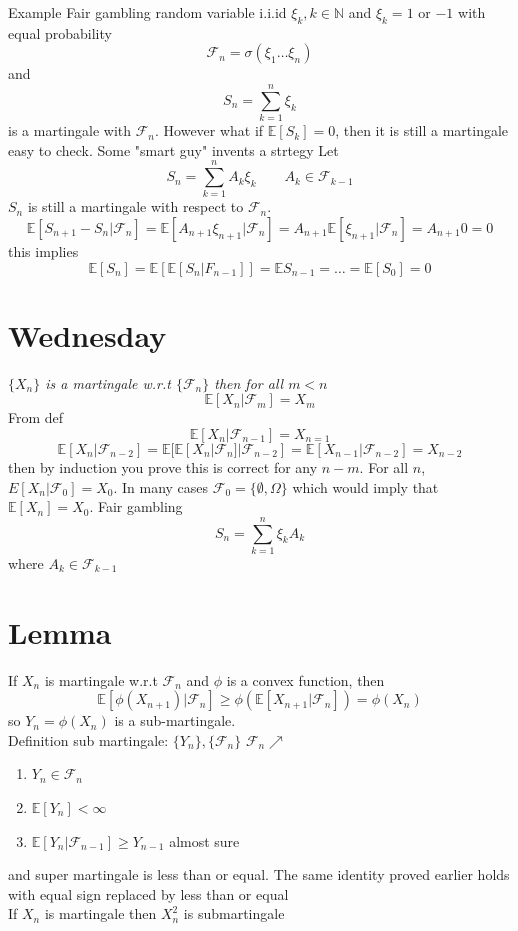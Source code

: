 \documentclass[11pt]{article}
\begin{document}
Example Fair gambling
random variable i.i.id $\xi_k, k \in \mathbb{N}$ and $\xi_k = 1$ or  $-1$ with equal probability
 \[
\mathcal{F}_n = \sigma(\xi_1 \dots \xi_n)
\] 
and
\[
S_n = \sum_{k=1}^{n} \xi_k
\] 
is a martingale with $ \mathcal{F}_n$.
However what if $ \mathbb{E}[S_k] = 0$, then it is still a martingale easy to check. Some "smart guy" invents a strtegy Let
\[
    S_n = \sum_{k=1}^{n}A_k \xi_k \qquad A_k \in \mathcal{F}_{k-1}
\] 
$S_n$ is still a martingale with respect to  $ \mathcal{F}_n$.
\[
    \mathbb{E}[S_{n+1} - S_n | \mathcal{F}_n] = \mathbb{E}[A_{n+1}\xi_{n+1}| \mathcal{F}_n] = A_{n+1} \mathbb{E}[ \xi_{n+1} | \mathcal{F}_n]  = A_{n+1} 0 = 0
\] 
this implies
\[
    \mathbb{E}[S_n] = \mathbb{E}[ \mathbb{E}[S_n | F_{n-1}]] = \mathbb{E} S_{n-1} = \dots = \mathbb{E}[S_0] = 0
\] 

\section{Wednesday}
\emph{
    $\{X_n\}$ is a martingale w.r.t $\{ \mathcal{F}_n\}$ then for all $m < n$
     \[
         \mathbb{E}[X_n | \mathcal{F}_m] = X_m
    \] 
}
From def
\[
    \mathbb{E}[X_n | \mathcal{F}_{n-1}] = X_{n=1}
\] 
\[
    \mathbb{E}[X_n | \mathcal{F}_{n-2}] = \mathbb{E}[ \mathbb{E}[X_n | \mathcal{F}_n] | \mathcal{F}_{n-2}] = \mathbb{E}[X_{n-1} | \mathcal{F}_{n-2}] = X_{n-2}
\] 
then by induction you prove this is correct for any $n-m$.
For all  $n$, $E[X_n | \mathcal{F}_0] = X_0$.
In many cases $ \mathcal{F}_0 = \{\emptyset, \Omega\}$ which would imply that $ \mathbb{E}[X_n] = X_0$.
Fair gambling 
\[
S_n = \sum_{k=1}^{n}\xi_k A_k
\] 
where $A_k \in \mathcal{F}_{k-1}$

\section{Lemma}
If $X_n$ is martingale w.r.t $ \mathcal{F}_n$ and $\phi$ is a convex function, then
\[
    \mathbb{E}[\phi(X_{n+1}) | \mathcal{F}_n] \ge  \phi( \mathbb{E}[X_{n+1} | \mathcal{F}_n]) = \phi(X_n)
\] 
so
$Y_n = \phi(X_n)$ is a sub-martingale.\\
Definition sub martingale:
$\{Y_n\}, \{ \mathcal{F}_n\}$ $ \mathcal{F}_n \nearrow$
\begin{enumerate}
    \item $Y_n \in \mathcal{F}_n$
    \item $ \mathbb{E}[Y_n] < \infty$
    \item $ \mathbb{E}[Y_n | \mathcal{F}_{n-1}] \ge Y_{n-1}$ almost sure
\end{enumerate}
and super martingale is less than or equal.
The same identity proved earlier holds with equal sign replaced by less than or equal\\
If $X_n$ is martingale then  $X_n^2$ is submartingale
\end{document}
